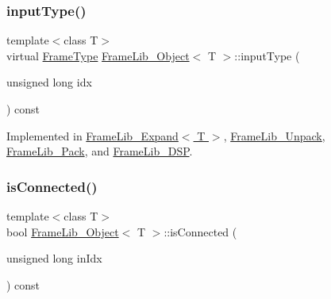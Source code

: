 \subsubsection{\texorpdfstring{input\+Type()}{inputType()}}
{\footnotesize\ttfamily template$<$class T$>$ \\
virtual \hyperlink{_frame_lib___types_8h_ad495a9f61af7fff07d7e97979d1ab854}{Frame\+Type} \hyperlink{class_frame_lib___object}{Frame\+Lib\+\_\+\+Object}$<$ T $>$\+::input\+Type (\begin{DoxyParamCaption}\item[{unsigned long}]{idx }\end{DoxyParamCaption}) const\hspace{0.3cm}{\ttfamily [pure virtual]}}



Implemented in \hyperlink{class_frame_lib___expand_abfe5f5550062e7cb351d45111dd2958c}{Frame\+Lib\+\_\+\+Expand$<$ T $>$}, \hyperlink{class_frame_lib___unpack_ac5053983d308b6c715ca2a59d4115ec8}{Frame\+Lib\+\_\+\+Unpack}, \hyperlink{class_frame_lib___pack_af516c48cb7d0e685c6572dbdd1377b66}{Frame\+Lib\+\_\+\+Pack}, and \hyperlink{class_frame_lib___d_s_p_a774197b0f41e1f78671fab6112a41ed9}{Frame\+Lib\+\_\+\+D\+SP}.

\mbox{\label{class_frame_lib___object_a2b4ed60a6032ff9fab191fcb492ef404}} 
\subsubsection{\texorpdfstring{is\+Connected()}{isConnected()}}
{\footnotesize\ttfamily template$<$class T$>$ \\
bool \hyperlink{class_frame_lib___object}{Frame\+Lib\+\_\+\+Object}$<$ T $>$\+::is\+Connected (\begin{DoxyParamCaption}\item[{unsigned long}]{in\+Idx }\end{DoxyParamCaption}) const\hspace{0.3cm}{\ttfamily [inline]}}

\mbox{\label{class_frame_lib___object_a4a4ce727ae1b9e9bb11162a9bf99e601}} 
